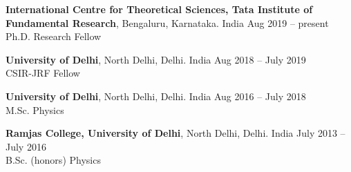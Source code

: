 {\bf International Centre for Theoretical Sciences, Tata Institute of Fundamental Research}, Bengaluru, Karnataka. India \hfill Aug 2019 -- present\\
Ph.D. Research Fellow

{\bf University of Delhi}, North Delhi, Delhi. India \hfill Aug 2018 -- July 2019\\
CSIR-JRF Fellow

{\bf University of Delhi}, North Delhi, Delhi. India \hfill Aug 2016 -- July 2018\\
M.Sc. Physics 

{\bf Ramjas College, University of Delhi}, North Delhi, Delhi. India \hfill July 2013 -- July 2016\\
B.Sc. (honors) Physics 


